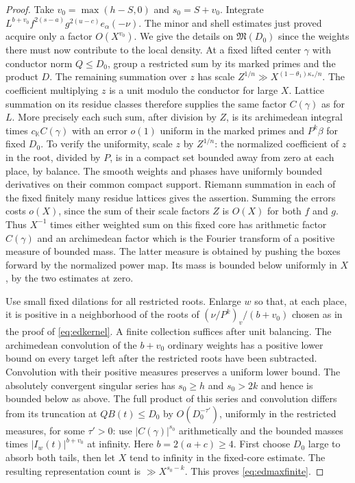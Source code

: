 \documentclass[11pt,letterpaper]{article}
\theoremstyle{definition}
\numberwithin{equation}{section}
\begin{document}
\begin{proof}
Take $v_0=\max(h-S,0)$ and $s_0=S+v_0$. Integrate
$L^{b+v_0} f^{2(s-a)}g^{2(u-c)}e_\alpha(-\nu)$. The minor and
shell estimates just proved acquire only a factor $O(X^{v_0})$.
We give the details on $\mathfrak M(D_0)$ since the weights there
must now contribute to the local density. At a fixed lifted center
$\gamma$ with conductor norm $Q\le D_0$, group a restricted sum by
its marked primes and the product $D$. The remaining summation over
$z$ has scale $Z^{1/n}\gg X^{(1-\theta_1)\kappa_*/n}$.
The coefficient multiplying $z$ is a unit modulo the conductor for
large $X$. Lattice summation on its residue classes therefore supplies
the same factor $C(\gamma)$ as for $L$. More precisely each such sum,
after division by $Z$, is its archimedean integral times
$c_{\mathbb K}C(\gamma)$ with an error $o(1)$ uniform in the marked
primes and $P^k\beta$ for fixed $D_0$. To verify the uniformity,
scale $z$ by $Z^{1/n}$: the normalized coefficient of $z$ in the
root, divided by $P$, is in a compact set bounded away from zero
at each place, by balance. The smooth weights and phases have
uniformly bounded derivatives on their common compact support.
Riemann summation in each of the fixed finitely many residue lattices
gives the assertion. Summing the errors costs $o(X)$, since the sum
of their scale factors $Z$ is $O(X)$ for both $f$ and $g$.
Thus $X^{-1}$ times either weighted sum on this fixed core has
arithmetic factor $C(\gamma)$ and an archimedean factor which is
the Fourier transform of a positive measure of bounded mass.
The latter measure is obtained by pushing the boxes forward by
the normalized power map. Its mass is bounded below uniformly in
$X$, by the two estimates at zero.

Use small fixed dilations for all restricted roots. Enlarge $w$ so
that, at each place, it is positive in a neighborhood of the roots
of $(\nu/P^k)_v/(b+v_0)$ chosen as in the proof of
\eqref{eq:edkernel}. A finite collection suffices after unit
balancing. The archimedean convolution of the $b+v_0$ ordinary
weights has a positive lower bound on every target left after the
restricted roots have been subtracted. Convolution with their
positive measures preserves a uniform lower bound. The absolutely
convergent singular series has $s_0\ge h$ and $s_0>2k$ and hence
is bounded below as above. The full product of this series and
convolution differs from its truncation at $QB(t)\le D_0$ by
$O(D_0^{-\tau'})$, uniformly in the restricted measures, for some
$\tau'>0$: use $|C(\gamma)|^{s_0}$ arithmetically and the bounded
masses times $|I_w(t)|^{b+v_0}$ at infinity. Here $b=2(a+c)\ge4$.
First choose $D_0$ large to absorb both tails, then let $X$ tend
to infinity in the fixed-core estimate. The resulting representation
count is $\gg X^{s_0-k}$. This proves \eqref{eq:edmaxfinite}.


\end{proof}
\end{document}

